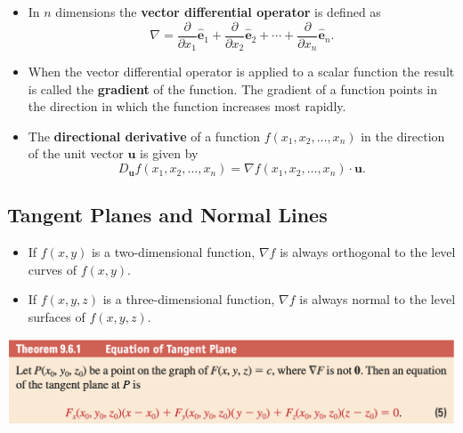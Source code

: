 \documentclass{article}
\begin{document}
\begin{itemize}
  \item In $n$ dimensions the \textbf{vector differential operator} is defined as \[\nabla = \frac{\partial}{\partial x_1} \hat{\mathbf{e}}_1 + \frac{\partial}{\partial x_2} \hat{\mathbf{e}}_2 + \cdots + \frac{\partial}{\partial x_n} \hat{\mathbf{e}}_n.\]

  \item When the vector differential operator is applied to a scalar function the result is called the \textbf{gradient} of the function. The gradient of a function points in the direction in which the function increases most rapidly.

  \item The \textbf{directional derivative} of a function $f(x_1, x_2, \ldots, x_n)$ in the direction of the unit vector $\mathbf{u}$ is given by \[D_\mathbf{u} f(x_1, x_2, \ldots, x_n) = \nabla f(x_1, x_2, \ldots, x_n) \cdot \mathbf{u}.\]
\end{itemize}

\subsection{Tangent Planes and Normal Lines}

\begin{itemize}
  \item If $f(x, y)$ is a two-dimensional function, $\nabla f$ is always orthogonal to the level curves of $f(x, y)$.

  \item If $f(x, y, z)$ is a three-dimensional function, $\nabla f$ is always normal to the level surfaces of $f(x, y, z)$.
\end{itemize}

\includegraphics[scale=0.443]{tangent-plane}
\end{document}
